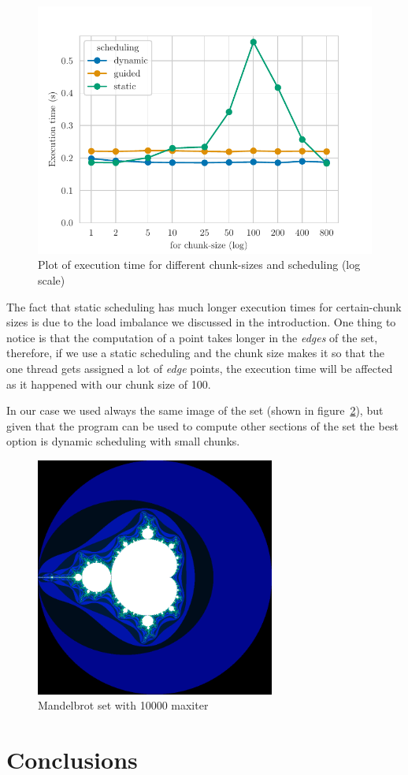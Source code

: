 \begin{figure}[H]
    \centering
    \includegraphics{plots/for-scheduling_log.pdf}
    \caption{Plot of execution time for different chunk-sizes and scheduling (log scale)}
    \label{fig:for_log} 
\end{figure}

The fact that static scheduling has much longer execution times for certain-chunk sizes is due to the load imbalance
we discussed in the introduction. One thing to notice is that the computation of a point takes longer in the \emph{edges}
of the set, therefore, if we use a static scheduling and the chunk size makes it so that the one thread gets assigned
a lot of \emph{edge} points, the execution time will be affected as it happened with our chunk size of 100. 

In our case we used always the same image of the set (shown in figure~\ref{fig:set}), but given that the program can be
used to compute other sections of the set the best option is dynamic scheduling with small chunks.

\begin{figure}[H]
    \centering
    \includegraphics[width=0.7\textwidth]{images/set.png}
    \caption{Mandelbrot set with 10000 maxiter}
    \label{fig:set} 
\end{figure}

\section{Conclusions}%
\label{sec:Conclusions}




